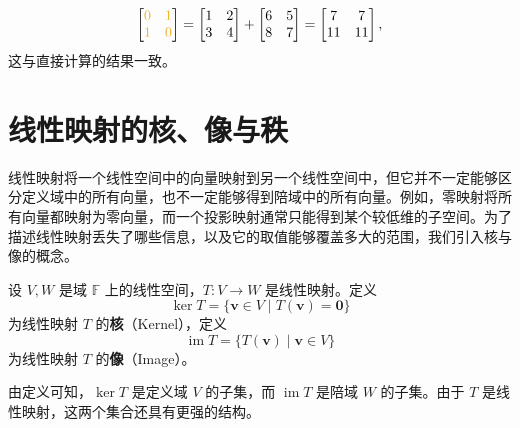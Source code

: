 \begin{example}
\[        \begin{bmatrix}\textcolor{c3}{0} & \textcolor{c3}{1} \\ \textcolor{c3}{1} & \textcolor{c3}{0}\end{bmatrix}
        =
        \begin{bmatrix}1 & 2 \\ 3 & 4\end{bmatrix}
        +
        \begin{bmatrix}6 & 5 \\ 8 & 7\end{bmatrix}
        =
        \begin{bmatrix}7 & 7 \\ 11 & 11\end{bmatrix},
    \]
    这与直接计算的结果一致。
\end{example}

\section{线性映射的核、像与秩}
\label{sec_kernel_image_rank}

线性映射将一个线性空间中的向量映射到另一个线性空间中，但它并不一定能够区分定义域中的所有向量，也不一定能够得到陪域中的所有向量。例如，零映射将所有向量都映射为零向量，而一个投影映射通常只能得到某个较低维的子空间。为了描述线性映射丢失了哪些信息，以及它的取值能够覆盖多大的范围，我们引入核与像的概念。

\begin{definition}[核与像]
    \label{def_kernel_image}
    设 \(V,W\) 是域 \(\mathbb F\) 上的线性空间，\(T:V\to W\) 是线性映射。定义
    \[
        \ker T=\{\bm v\in V\mid T(\bm v)=\bm 0\}
    \]
    为线性映射 \(T\) 的\textbf{核}（Kernel），定义
    \[
        \operatorname{im}T=\{T(\bm v)\mid \bm v\in V\}
    \]
    为线性映射 \(T\) 的\textbf{像}（Image）。
\end{definition}

由定义可知，\(\ker T\) 是定义域 \(V\) 的子集，而 \(\operatorname{im}T\) 是陪域 \(W\) 的子集。由于 \(T\) 是线性映射，这两个集合还具有更强的结构。

